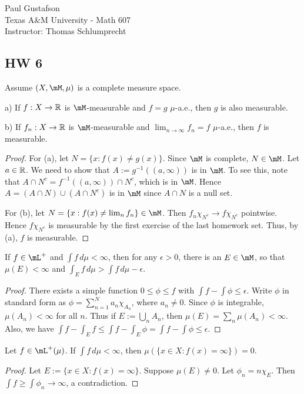 \documentclass{article}
\begin{document}
\noindent Paul Gustafson\\
\noindent Texas A\&M University - Math 607\\ 
\noindent Instructor: Thomas Schlumprecht

\subsection*{HW 6}
 Assume $(X, \mM, \mu)$ is a complete measure space.

a) If $f : X \to \mathbb{R}$ is $\mM$-measurable and $f = g$ $\mu$-a.e., then $g$ is also measurable.

b) If $f_n : X \to \mathbb{R}$ is $\mM$-measurable and $\lim_{n \to \infty} f_n = f$ $\mu$-a.e., then $f$ is measurable.

\begin{proof}
For (a), let $N = \{x : f(x) \neq g(x)\}$. Since $\mM$ is complete, $N \in \mM$.  Let $a \in \mathbb{R}$.  We need to show that $A := g^{-1}((a,\infty))$ is in $\mM$.  To see this, note that $A \cap N^c = f^{-1}((a,\infty)) \cap N^c$, which is in $\mM$.  Hence $A = (A \cap N) \cup (A \cap N^c)$ is in $\mM$ since $A \cap N$ is a null set.

For (b),  let $N = \{x : f(x) \neq \lim_n f_n \} \in \mM$.  Then $f_n \chi_{N^c} \to f \chi_{N^c}$ pointwise. Hence $f \chi_{N^c}$ is measurable by the first exercise of the last homework set.  Thus, by (a), $f$ is measurable.
\end{proof}

 If $f \in \mL^+$ and $\int f \,d \mu < \infty$, then for any $\epsilon > 0$, there is an $E \in \mM$, so that $\mu(E) < \infty$ and $\int_E f \,d\mu > \int f\,d \mu - \epsilon$.

\begin{proof}
There exists a simple function $0 \le \phi \le f$ with $\int f - \int \phi \le \epsilon$.  Write $\phi$ in standard form as $\phi = \sum_{n=1}^N a_n \chi_{A_n}$, where $a_n \neq 0$.  Since $\phi$ is integrable,  $\mu(A_n) < \infty$ for all $n$.  Thus if $E := \bigcup_n A_n$, then $\mu(E) = \sum_n \mu(A_n) < \infty$. Also, we have $\int f - \int_E f \le \int f - \int_E \phi = \int f - \int \phi \le \epsilon$.
\end{proof}

 Let $f \in \mL^+(\mu)$. If $\int f \, d\mu < \infty$, then $\mu(\{x \in X : f(x) = \infty \}) = 0$.

\begin{proof}
Let $E := \{x \in X : f(x) = \infty \}$.  Suppose $\mu(E) \neq 0$.  Let $\phi_n = n \chi_E$.  Then $\int f \ge \int \phi_n \to \infty$, a contradiction.
\end{proof}
\end{document}
